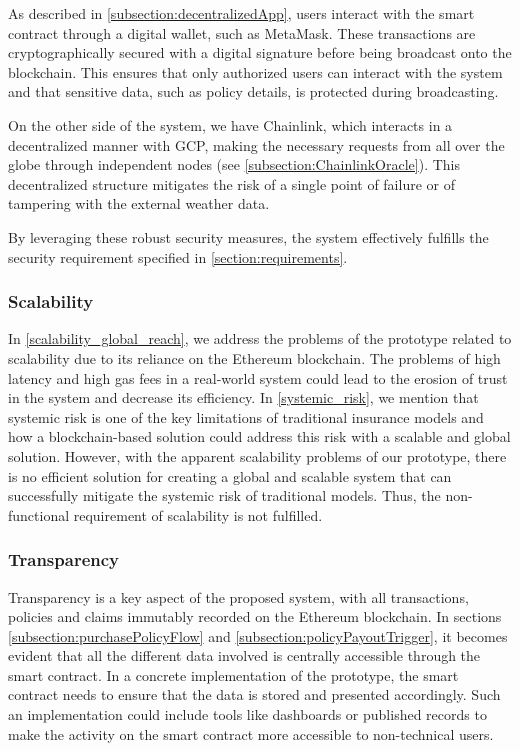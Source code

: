 As described in \cref{subsection:decentralizedApp}, users interact with the smart contract through a digital wallet, such as MetaMask. These transactions are cryptographically secured with a digital signature before being broadcast onto the blockchain. This ensures that only authorized users can interact with the system and that sensitive data, such as policy details, is protected during broadcasting.

On the other side of the system, we have Chainlink, which interacts in a decentralized manner with GCP, making the necessary requests from all over the globe through independent nodes (see \cref{subsection:ChainlinkOracle}). This decentralized structure mitigates the risk of a single point of failure or of tampering with the external weather data.

By leveraging these robust security measures, the system effectively fulfills the security requirement specified in \cref{section:requirements}.

\subsubsection{Scalability}\label{Scalability_requiremnt}
In \cref{scalability_global_reach}, we address the problems of the prototype related to scalability due to its reliance on the Ethereum blockchain. The problems of high latency and high gas fees in a real-world system could lead to the erosion of trust in the system and decrease its efficiency. In \cref{systemic_risk}, we mention that systemic risk is one of the key limitations of traditional insurance models and how a blockchain-based solution could address this risk with a scalable and global solution. However, with the apparent scalability problems of our prototype, there is no efficient solution for creating a global and scalable system that can successfully mitigate the systemic risk of traditional models. Thus, the non-functional requirement of scalability is not fulfilled.

\subsubsection{Transparency}
Transparency is a key aspect of the proposed system, with all transactions, policies and claims immutably recorded on the Ethereum blockchain. In sections \cref{subsection:purchasePolicyFlow} and \cref{subsection:policyPayoutTrigger}, it becomes evident that all the different data involved is centrally accessible through the smart contract. In a concrete implementation of the prototype, the smart contract needs to ensure that the data is stored and presented accordingly. Such an implementation could include tools like dashboards or published records to make the activity on the smart contract more accessible to non-technical users.

